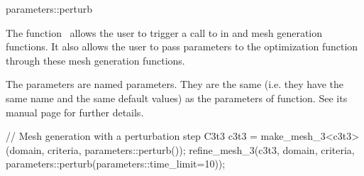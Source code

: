 \ccRefPageBegin

\begin{ccRefFunction}{parameters::perturb}  %


\ccDefinition
  
The function \ccRefName\ allows the user to trigger a call to
 in
 and  mesh generation functions. It also
allows the user to pass parameters 
to the optimization function  through these mesh generation functions.



\ccParameters

The parameters are named parameters. They are the same (i.e. they have the same
name and the same default values) as the parameters of 
function. See its manual page for further details.




\ccExample

\begin{ccExampleCode}
// Mesh generation with a perturbation step
C3t3 c3t3 = make_mesh_3<c3t3>(domain, criteria, parameters::perturb());
refine_mesh_3(c3t3, domain, criteria, parameters::perturb(parameters::time_limit=10));
\end{ccExampleCode}

\ccSeeAlso

 \\
 \\
 \\


\end{ccRefFunction}

\ccRefPageEnd


